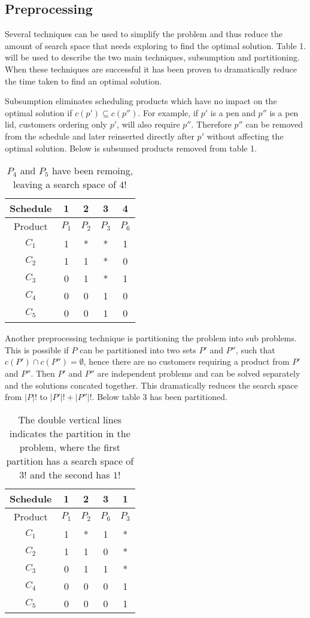 \subsection{Preprocessing}

Several techniques can be used to simplify the problem and thus reduce the
amount of search space that needs exploring to find the optimal solution. Table
1. will be used to describe the two main techniques, subsumption and
partitioning. When these techniques are successful it has been proven to
dramatically reduce the time taken to find an optimal solution.

Subsumption eliminates scheduling products which have no impact on the optimal
solution if $c(p') \subseteq c(p'')$. For example, if $p'$ is a pen and $p''$
is a pen lid, customers ordering only $p'$, will also require $p''$.  Therefore
$p''$ can be removed from the schedule and later reinserted directly after $p'$
without affecting the optimal solution. Below is subsumed products removed from
table 1.

\begin{table}[H]
\begin{tabular}{|c|c|c|c|c|}\hline
Schedule & 1 & 2 & 3 & 4 \\
\hline
Product&$P_1$&$P_2$&$P_3$&$P_6$\\
\hline
$C_1$&1&*&*&1\\
$C_2$&1&1&*&0\\
$C_3$&0&1&*&1\\
$C_4$&0&0&1&0\\
$C_5$&0&0&1&0\\
\hline
\end{tabular}
\caption{$P_4$ and $P_5$ have been remoing, leaving a search space of $4!$}
\end{table}

Another preprocessing technique is partitioning the problem into sub problems.
This is possible if $P$ can be partitioned into two sets $P'$ and $P''$, such
that $c(P') \cap c(P'') = \emptyset$, hence there are no customers requiring a
product from $P'$ and $P''$. Then $P'$ and $P''$ are independent problems and
can be solved separately and the solutions concated together. This dramatically
reduces the search space from $|P|!$ to $|P'|! + |P''|!$. Below table 3 has
been partitioned.

\begin{table}[H]
\begin{tabular}{|c|c|c|c||c|}\hline
Schedule & 1 & 2 & 3 & 1 \\
\hline
Product&$P_1$&$P_2$&$P_6$&$P_3$\\
\hline
$C_1$&1&*&1&*\\
$C_2$&1&1&0&*\\
$C_3$&0&1&1&*\\
$C_4$&0&0&0&1\\
$C_5$&0&0&0&1\\
\hline
\end{tabular} \caption{The double vertical lines indicates the partition in the
problem, where the first partition has a search space of  $3!$ and the second has $1!$} \end{table}


